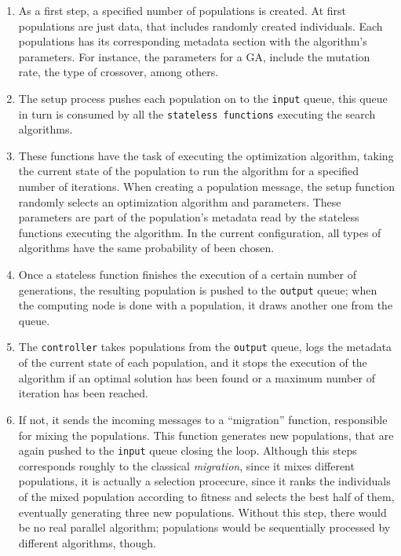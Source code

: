 \documentclass[runningheads]{llncs}
\begin{document}
\begin{enumerate}

\item As a first step, a specified number of populations is created. 
At first populations are just data, that includes randomly created individuals.
Each populations has its corresponding metadata section with the algorithm's parameters.
For instance, the parameters for a GA, include the mutation rate, the type of crossover, among others.

\item The setup process pushes each population on to the \texttt{input}
queue, this queue in turn is consumed by all the \texttt{stateless functions} executing 
the search algorithms.

\item These functions have the task of executing the optimization algorithm, taking the 
current state of the population to run the algorithm for a specified number of
iterations. When creating a population message, the setup function randomly
selects an optimization algorithm and parameters. These parameters
are part of the population's metadata read by the stateless
functions executing the algorithm. In the current configuration, all
types of algorithms have the same probability of been chosen. %

\item Once a stateless function finishes the execution of a certain number of
  generations, the resulting population is pushed to 
the \texttt{output} queue; when the computing node is done with a population, it draws another one from the
queue.

\item The \texttt{controller} takes populations from the \texttt{output} queue,
logs the metadata of the current state of each population, and it stops the execution
of the algorithm if an optimal solution has been found or a maximum number of iteration
has been reached.

\item If not, it sends the incoming messages to a ``migration'' function,
  responsible for mixing the populations. This function generates new populations,
  that are again pushed to the \texttt{input} queue closing the loop.
  Although this steps corresponds roughly to the classical
{\em migration}, since it mixes different populations, it is actually
a selection procecure, since it ranks the individuals of the mixed
population according to fitness and selects the best half of them,
eventually generating three new populations. Without this step, there
would be no real parallel algorithm; populations would be sequentially
processed by different algorithms, though.

\end{enumerate}
\end{document}
